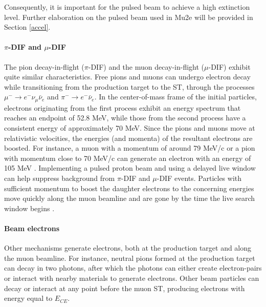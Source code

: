 Consequently, 
it is important for the pulsed beam to achieve a high extinction level. Further elaboration 
on the pulsed beam used in Mu2e will be provided in Section \ref{accel}.
\paragraph{$\pi$-DIF and $\mu$-DIF}
The pion decay-in-flight ($\pi$-DIF) and the muon decay-in-flight ($\mu$-DIF) 
exhibit quite similar characteristics. Free pions and muons can 
undergo electron decay while transitioning from the 
production target to the ST, through the processes 
$\mu^- \rightarrow e^- \nu_\mu \bar{\nu}_e$ and 
$\pi^- \rightarrow e^- \bar{\nu}_e$. In the center-of-mass 
frame of the initial particles, electrons originating 
from the first process exhibit an energy spectrum that 
reaches an endpoint of 52.8 MeV, while those from the 
second process have a consistent energy of approximately 
70 MeV. Since the pions and muons move at relativistic velocities, 
the energies (and momenta) of the resultant electrons are 
boosted. For instance, a muon with a momentum of around 
79 MeV/c or a pion with momentum close to 70 MeV/c can generate 
an electron with an energy of 105 MeV \cite{bartoszek2015mu2e}. 
Implementing a pulsed proton beam and using a delayed 
live window can help suppress background from $\pi$-DIF and 
$\mu$-DIF events. Particles with sufficient momentum 
to boost the daughter electrons to the concerning energies 
move quickly along the muon beamline and are gone by the 
time the live search window begins \cite{bobbb}. 

\paragraph{Beam electrons}\label{beamelectrons}
Other mechanisms generate electrons, both at the production target 
and along the muon beamline. For instance, neutral pions formed at 
the production target can decay in two photons, after which the 
photons can either create electron-pairs or interact with nearby 
materials to generate electrons. {\red Other beam particles can decay or 
interact at any point before the muon ST, producing electrons 
with energy equal to $E_{CE}$.}

